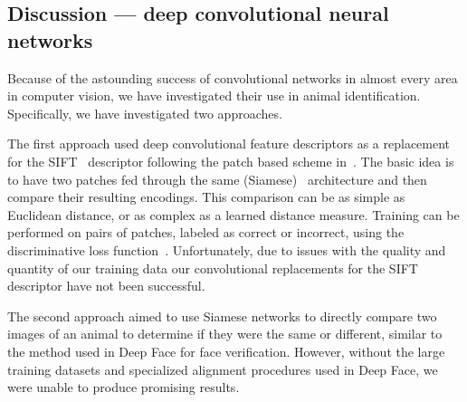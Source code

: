 



  \subsection{Discussion --- deep convolutional neural networks}\label{subsec:dcnndiscuss}
        Because of the astounding success of convolutional networks in almost every area in computer vision, we have
        investigated their use in animal identification. Specifically, we have investigated two approaches.

        The first approach used deep convolutional feature descriptors as a replacement for the
        SIFT~\cite{lowe_distinctive_2004} descriptor following the patch based scheme in~\cite{zagoruyko_learning_2015}.
        The basic idea is to have two patches fed through the same (Siamese)~\cite{chopra_learning_2005} architecture
        and then compare their resulting encodings. This comparison can be as simple as Euclidean distance, or as
        complex as a learned distance measure. Training can be performed on pairs of patches, labeled as correct or
        incorrect, using the discriminative loss function~\cite{lecun_loss_2005}. Unfortunately, due to issues with the
        quality and quantity of our training data our convolutional replacements for the SIFT descriptor have not been
        successful.

        The second approach aimed to use Siamese networks to directly compare two images of an animal to determine if
        they were the same or different, similar to the method used in Deep Face\cite{taigman_deepface_2014} for face
        verification. However, without the large training datasets and specialized alignment procedures used in Deep
        Face, we were unable to produce promising results.
        
